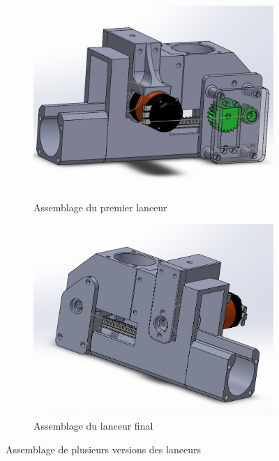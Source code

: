 \begin{figure}[h!]
    \centering

    \begin{subfigure}{0.4\linewidth}
        \centering
        \includegraphics[width=\linewidth]{img/s2/cad/lanceur1}
        \caption{Assemblage du premier lanceur}
        \label{fig:s2-cad-lanceur1}
    \end{subfigure}
    \begin{subfigure}{0.4\linewidth}
        \centering
        \includegraphics[width=\linewidth]{img/s2/cad/lanceur2}
        \caption{Assemblage du lanceur final}
        \label{fig:s2-cad-lanceur2}
    \end{subfigure}

    \caption{Assemblage de plusieurs versions des lanceurs}
    \label{fig:s2-cad-lanceurs}
\end{figure}

